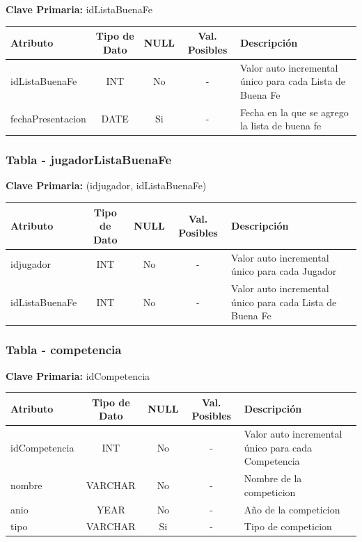 \textbf{Clave Primaria: } idListaBuenaFe

\begin{table}[H]
	\centering
	\begin{tabularx}{\textwidth}{|l|c|c|c|X|} \hline
		\textbf{Atributo} & \textbf{Tipo de Dato} & \textbf{NULL} & \textbf{Val. Posibles} & \textbf{Descripción} \\ \hline
		idListaBuenaFe & INT & No & - & Valor auto incremental único para cada Lista de Buena Fe \\ \hline
		fechaPresentacion & DATE & Si & - & Fecha en la que se agrego la lista de buena fe\\ \hline
	\end{tabularx}
\end{table}

\subsubsection{Tabla - jugadorListaBuenaFe}

\textbf{Clave Primaria: } (idjugador, idListaBuenaFe)

\begin{table}[H]
	\centering
	\begin{tabularx}{\textwidth}{|l|c|c|c|X|} \hline
		\textbf{Atributo} & \textbf{Tipo de Dato} & \textbf{NULL} & \textbf{Val. Posibles} & \textbf{Descripción} \\ \hline
		idjugador  & INT & No & - & Valor auto incremental único para cada Jugador \\ \hline
		idListaBuenaFe & INT & No & - & Valor auto incremental único para cada Lista de Buena Fe\\ \hline
	\end{tabularx}
\end{table}

\subsubsection{Tabla - competencia}

\textbf{Clave Primaria: } idCompetencia

\begin{table}[H]
	\centering
	\begin{tabularx}{\textwidth}{|l|c|c|c|X|} \hline
		\textbf{Atributo} & \textbf{Tipo de Dato} & \textbf{NULL} & \textbf{Val. Posibles} & \textbf{Descripción} \\ \hline
		idCompetencia  & INT & No & - & Valor auto incremental único para cada Competencia \\ \hline
		nombre & VARCHAR & No & - & Nombre de la competicion\\ \hline
		anio & YEAR & No & - & Año de la competicion\\ \hline
		tipo & VARCHAR & Si & - & Tipo de competicion\\ \hline
	\end{tabularx}
\end{table}

